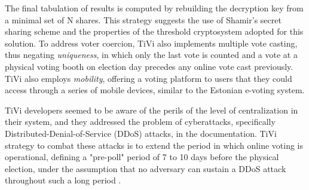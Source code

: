 \documentclass[../access.tex]{subfiles}
\begin{document}
		\par
        The final tabulation of results is computed by rebuilding the decryption key from a minimal set of N shares. This strategy suggests the use of Shamir's secret sharing scheme and the  properties of the threshold cryptosystem adopted for this solution. To address voter coercion, TiVi also implements multiple vote casting, thus negating \textit{uniqueness}, in which only the last vote is counted and a vote at a physical voting booth on election day precedes any online vote cast previously. TiVi also employs \textit{mobility}, offering a voting platform to users that they could access through a series of mobile devices, similar to the Estonian e-voting system.
		\par
		TiVi developers seemed to be aware of the perils of the level of centralization in their system, and they addressed the problem of cyberattacks, specifically Distributed-Denial-of-Service (DDoS) attacks, in the documentation. TiVi strategy to combat these attacks is to extend the period in which online voting is operational, defining a "pre-poll" period of 7 to 10 days before the physical election, under the assumption that no adversary can sustain a DDoS attack throughout such a long period \cite{Tivi2021a}.
	
\end{document}
